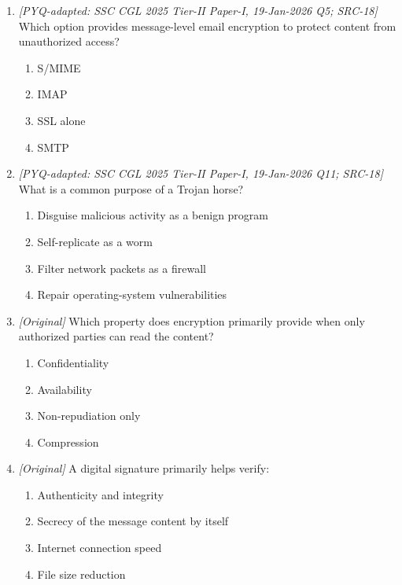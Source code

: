 \begin{enumerate}[label=\textbf{Q\arabic*.}, leftmargin=*]
\begin{enumerate}[label=\Alph*.]
    \item Hashing checks data integrity.
    \item Encryption makes data print faster.
  \end{enumerate}
\item \textit{[PYQ-adapted: SSC CGL 2025 Tier-II Paper-I, 19-Jan-2026 Q5; SRC-18]} Which option provides message-level email encryption to protect content from unauthorized access?
  \begin{enumerate}[label=\Alph*.]
\item S/MIME
   \item IMAP
   \item SSL alone
   \item SMTP
  \end{enumerate}

\item \textit{[PYQ-adapted: SSC CGL 2025 Tier-II Paper-I, 19-Jan-2026 Q11; SRC-18]} What is a common purpose of a Trojan horse?
  \begin{enumerate}[label=\Alph*.]
\item Disguise malicious activity as a benign program
   \item Self-replicate as a worm
   \item Filter network packets as a firewall
   \item Repair operating-system vulnerabilities
  \end{enumerate}

\item \textit{[Original]} Which property does encryption primarily provide when only authorized parties can read the content?
  \begin{enumerate}[label=\Alph*.]
\item Confidentiality
   \item Availability
   \item Non-repudiation only
   \item Compression
  \end{enumerate}

\item \textit{[Original]} A digital signature primarily helps verify:
  \begin{enumerate}[label=\Alph*.]
\item Authenticity and integrity
   \item Secrecy of the message content by itself
   \item Internet connection speed
   \item File size reduction
  \end{enumerate}


\end{enumerate}

